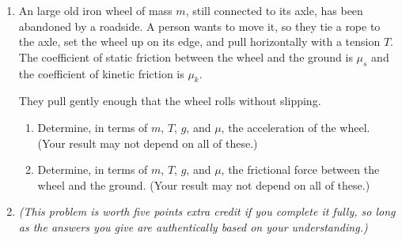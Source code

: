 \documentclass[12pt]{article}
\begin{document}
\begin{enumerate}
\bigskip
%
%
%
%
%
%

\item An large old iron wheel of mass $m$, still connected to its axle, has been abandoned by a roadside. A person wants to move it, so they tie a rope to the axle, set the wheel up on its edge, and pull horizontally with a tension $T$. The coefficient of static friction between the wheel and the ground is $\mu_s$ and the coefficient of kinetic friction is $\mu_k$.

They pull gently enough that the wheel rolls without slipping.

\begin{enumerate}
	\item Determine, in terms of $m$, $T$, $g$, and $\mu$, the acceleration of the wheel. (Your result may not depend on all of these.)
	
	\item Determine, in terms of $m$, $T$, $g$, and $\mu$, the frictional force between the wheel and the ground. (Your result may not depend on all of these.)	
\end{enumerate}

\newpage

\item {\it (This problem is worth five points extra credit if you complete it fully, so long as the answers you give are authentically based on your understanding.)}


\end{enumerate}
\end{document}
